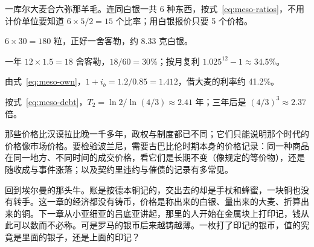 \begin{answers}
\item 一库尔大麦合六弥那羊毛。连同白银一共 6 种东西，按式~\eqref{eq:meso-ratios}，不用计价单位要知道 $6\times5/2=15$ 个比率；用白银报价只要 5 个价格。
\item $6\times30=180$ 粒，正好一舍客勒，约 8.33 克白银。
\item 一年 $12\times1.5=18$ 舍客勒，$18/60=30\%$；按月复利 $1.025^{12}-1\approx34.5\%$。
\item 由式~\eqref{eq:meso-own}，$1+i_b=1.2/0.85=1.412$，借大麦的利率约 41.2\%。
\item 按式~\eqref{eq:meso-debt}，$T_2=\ln2/\ln(4/3)\approx2.41$ 年；三年后是 $(4/3)^{3}\approx2.37$ 倍。
\item 那些价格比汉谟拉比晚一千多年，政权与制度都已不同；它们只能说明那个时代的价格像市场价格。要检验波兰尼，需要古巴比伦时期本身的价格记录：同一种商品在同一地方、不同时间的成交价格，看它们是长期不变（像规定的等价物），还是随收成与事件涨落；以及契约里违约与催债的记录有多常见。
\end{answers}

回到埃尔曼的那头牛。账是按德本铜记的，交出去的却是手杖和蜂蜜，一块铜也没有转手。这一章的经济都没有铸币，价格是称出来的白银、量出来的大麦、折算出来的铜。下一章从小亚细亚的吕底亚讲起，那里的人开始在金属块上打印记，钱从此可以数而不必称。可是罗马的银币后来越铸越薄。一枚打了印记的银币，值的究竟是里面的银子，还是上面的印记？
